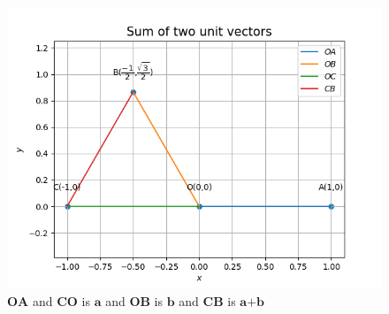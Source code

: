 \documentclass{article}
\renewcommand{\vec}[1]{\textbf{#1}}
\begin{document}
\begin{figure}[!h]
	\begin{center}
	\includegraphics[width=\columnwidth]{codes/Python/figs/fig.png}
	\end{center}
	\caption{$\vec{OA}$ and $\vec{CO}$ is $\vec{a}$ and $\vec{OB}$ is $\vec{b}$ and $\vec{CB}$ is $\vec{a+b}$}
	\label{fig:Fig1}
\end{figure}
\end{document}
